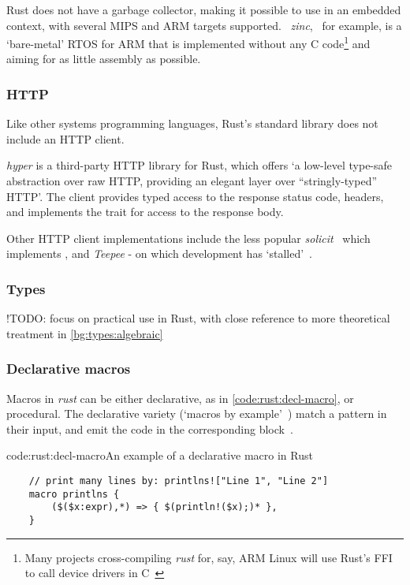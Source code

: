 Rust does not have a garbage collector, making it possible to use in an embedded context, with several MIPS and ARM targets supported.~\cite{rust_platforms} \emph{zinc},~\cite{rust_rtos_zinc} for example, is a `bare-metal' RTOS for ARM that is implemented without any C code\footnote{Many projects cross-compiling \emph{rust} for, say, ARM Linux will use Rust's FFI to call device drivers in C~\cite{rust_baremetal}} and aiming for as little assembly as possible.

\subsubsection{HTTP} \label{bg:rust:http}
Like other systems programming languages, Rust's standard library does not include an HTTP client.

\emph{hyper} is a third-party HTTP library for Rust, which offers `a low-level type-safe abstraction over raw HTTP, providing an elegant layer over ``stringly-typed'' HTTP'. The client provides typed access to the response status code, headers, and implements the  trait for access to the response body. \cite{rust_http_hyper}

Other HTTP client implementations include the less popular \emph{solicit}~\cite{rust_http_solicit} which implements , and \emph{Teepee} - on which development has `stalled'~\cite{rust_http_teepee}.

\subsubsection{Types} \label{bg:rust:types}

!TODO: focus on practical use in Rust, with close reference to more theoretical treatment in \cref{bg:types:algebraic}

\subsubsection{Declarative macros} \label{bg:rust:decl-macros}
Macros in \emph{rust} can be either declarative, as in \cref{code:rust:decl-macro}, or procedural. The declarative variety (`macros by example'~\cite{macro_by_example}) match a pattern in their input, and emit the code in the corresponding block~\cite{rust_macros_overview}.

\begin{codelisting}{code:rust:decl-macro}{An example of a declarative macro in Rust}
\begin{verbatim}
	// print many lines by: printlns!["Line 1", "Line 2"]
	macro printlns {
		($($x:expr),*) => { $(println!($x);)* },
	}
\end{verbatim}	
\end{codelisting}


